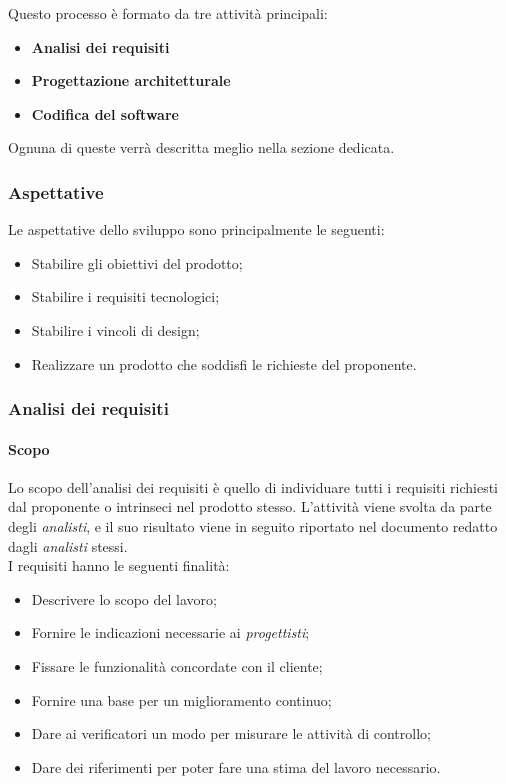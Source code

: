 Questo processo è formato da tre attività principali:
\begin{itemize}
    \item \textbf{Analisi dei requisiti}
    \item \textbf{Progettazione architetturale}
    \item \textbf{Codifica del software}
\end{itemize}

Ognuna di queste verrà descritta meglio nella sezione dedicata.

\subsubsection{Aspettative}

Le aspettative dello sviluppo sono principalmente le seguenti:

\begin{itemize}
    \item Stabilire gli obiettivi del prodotto;
    \item Stabilire i requisiti tecnologici;
    \item Stabilire i vincoli di design;
    \item Realizzare un prodotto che soddisfi le richieste del proponente.
\end{itemize}

\subsubsection{Analisi dei requisiti}

\paragraph{Scopo}

Lo scopo dell'analisi dei requisiti è quello di individuare tutti i requisiti richiesti dal proponente o intrinseci nel 
prodotto stesso. L'attività viene svolta da parte degli \emph{analisti}, e il suo risultato viene in seguito riportato 
nel documento  redatto dagli \emph{analisti} stessi. \\
I requisiti hanno le seguenti finalità:
\begin{itemize}
    \item Descrivere lo scopo del lavoro;
    \item Fornire le indicazioni necessarie ai \emph{progettisti};
    \item Fissare le funzionalità concordate con il cliente;
    \item Fornire una base per un miglioramento continuo;
    \item Dare ai verificatori un modo per misurare le attività di controllo;
    \item Dare dei riferimenti per poter fare una stima del lavoro necessario.
\end{itemize}

